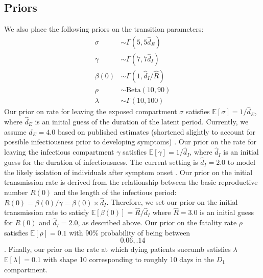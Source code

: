\documentclass[11pt]{amsart}
\newcommand{\Beta}{\text{Beta}}
\newcommand{\E}{\mathbb{E}}
\begin{document}
  \subsection{Priors}
We also place the following priors on the transition parameters: 
\begin{align*}
\sigma &\sim \Gamma(5, 5 \hat{d}_E)\\
\gamma & \sim \Gamma(7, 7 \hat{d}_I) \\
\beta(0) &\sim \Gamma(1, \hat{d}_I/\hat{R}) \\
    \rho &\sim \Beta(10, 90)\\ 
\lambda &\sim \Gamma(10, 100)
\end{align*}
 Our prior on rate for leaving the exposed compartment $\sigma$ satisfies $\E[\sigma] = 1/\hat{d}_E$, where $\hat{d}_E$ is an initial guess of the duration of the latent period. Currently, we assume $\hat{d}_E = 4.0$ based on published estimates (shortened slightly to account for possible infectiousness prior to developing symptoms) \cite{midas}.
 Our prior on the rate for leaving the infectious compartment $\gamma$ satisfies $\E[\gamma] = 1/\hat{d}_I$, where $\hat{d}_I$ is an initial guess for the duration of infectiousness. The current setting is $\hat{d}_I = 2.0$ to model the likely isolation of individuals after symptom onset \cite{heffner2020emotional}. 
Our prior on the initial transmission rate is derived from the relationship between the basic reproductive number $R(0)$ and the length of the infectious period: $R(0) = \beta(0)/\gamma = \beta(0)\times \hat{d}_I$. Therefore, we set our prior on the initial transmission rate to satisfy $\E[\beta(0)] = \hat{R}/\hat{d}_I$ where $\hat{R} = 3.0$ is an initial guess for $R(0)$ and $\hat{d}_I = 2.0$, as described above. 
Our prior on the fatality rate $\rho$ satisfies $\E[\rho] = 0.1$ with 90\% probability of being between \[0.06,.14\].
Finally, our prior on the rate at which dying patients succumb  satisfies $\lambda$ $\E[\lambda] = 0.1$ with shape 10 corresponding to roughly 10 days in the $D_{1}$ compartment.

\newpage 


\end{document}
